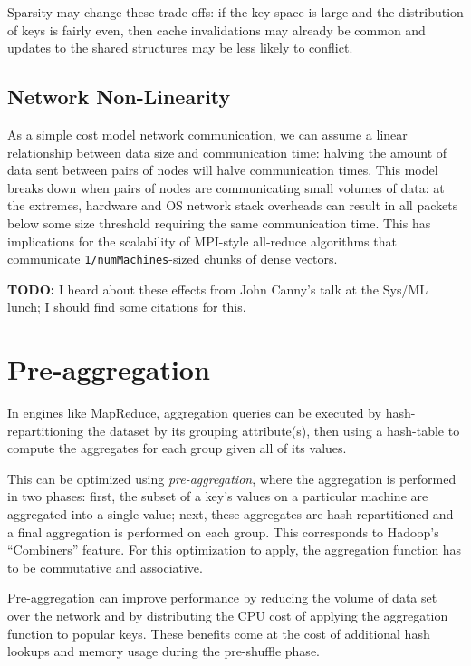 \documentclass[12pt]{article}
\begin{document}
Sparsity may change these trade-offs: if the key space is large and the
distribution of keys is fairly even, then cache invalidations may already be
common and updates to the shared structures may be less likely to conflict.

\subsection{Network Non-Linearity}

As a simple cost model network communication, we can assume a linear relationship between data size and communication time: halving the amount of data sent between pairs of nodes will halve communication times.
This model breaks down when pairs of nodes are communicating small volumes of data: at the extremes, hardware and OS network stack overheads can result in all packets below some size threshold requiring the same communication time.
This has implications for the scalability of MPI-style all-reduce algorithms that communicate \texttt{1/numMachines}-sized chunks of dense vectors.

\textbf{TODO:} I heard about these effects from John Canny's talk at the Sys/ML lunch; I should find some citations for this.


\section{Pre-aggregation}

In engines like MapReduce, aggregation queries can be executed by
hash-repartitioning the dataset by its grouping attribute(s), then using
a hash-table to compute the aggregates for each group given all of its values.

This can be optimized using \emph{pre-aggregation}, where the aggregation is
performed in two phases: first, the subset of a key's values on a particular
machine are aggregated into a single value; next, these aggregates are
hash-repartitioned and a final aggregation is performed on each group.
This corresponds to Hadoop's ``Combiners'' feature.
For this optimization to apply, the aggregation function has to be commutative
and associative.

Pre-aggregation can improve performance by reducing the volume of data set
over the network and by distributing the CPU cost of applying the aggregation
function to popular keys.
These benefits come at the cost of additional hash lookups and memory usage
during the pre-shuffle phase.
\end{document}
